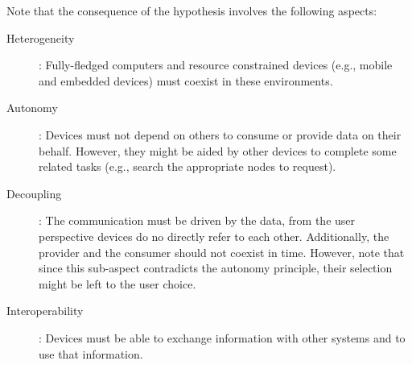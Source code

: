 Note that the consequence of the hypothesis involves the following aspects:
\begin{description}
  \item[Heterogeneity]: Fully-fledged computers and resource constrained devices (e.g., mobile and embedded devices) must coexist in these environments.
  \item[Autonomy]: Devices must not depend on others to consume or provide data on their behalf.
                   However, they might be aided by other devices to complete some related tasks (e.g., search the appropriate nodes to request).
  \item[Decoupling]: The communication must be driven by the data, from the user perspective devices do no directly refer to each other.
		    Additionally, the provider and the consumer should not coexist in time.
		    However, note that since this sub-aspect contradicts the autonomy principle, their selection might be left to the user choice.
  \item[Interoperability]: Devices must be able to exchange information with other systems and to use that information. %
\end{description}